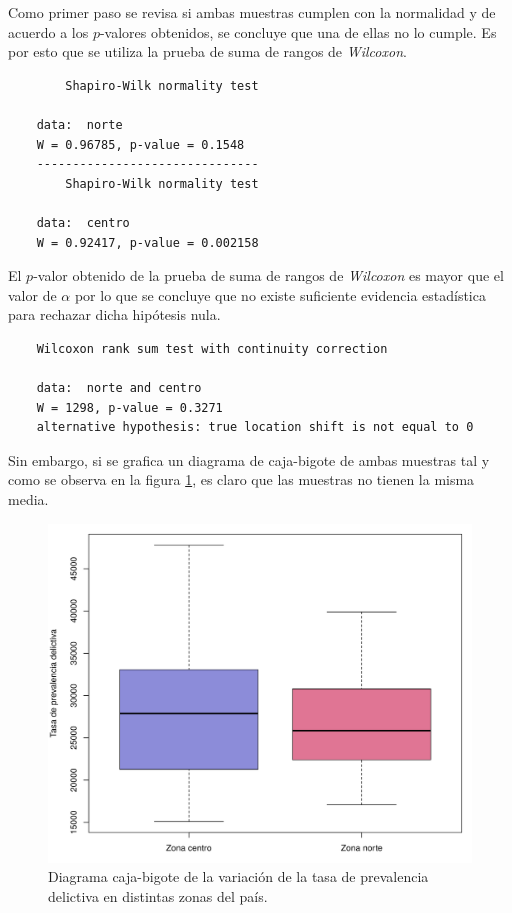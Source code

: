 \documentclass[12pt]{article}
\begin{document}
	Como primer paso se revisa si ambas muestras cumplen con la normalidad y de acuerdo a los $p$-valores obtenidos, se concluye que una de ellas no lo cumple. Es por esto que se utiliza la prueba de suma de rangos de {\em Wilcoxon}. 
	\begin{verbatim}
		Shapiro-Wilk normality test
	
	data:  norte
	W = 0.96785, p-value = 0.1548
	-------------------------------
		Shapiro-Wilk normality test
	
	data:  centro
	W = 0.92417, p-value = 0.002158
	\end{verbatim}
	
	El $p$-valor obtenido de la prueba de suma de rangos de {\em Wilcoxon} es mayor que el valor de $\alpha$ por lo que se concluye que no existe suficiente evidencia estadística para rechazar dicha hipótesis nula.
	\begin{verbatim}
	Wilcoxon rank sum test with continuity correction

	data:  norte and centro
	W = 1298, p-value = 0.3271
	alternative hypothesis: true location shift is not equal to 0
	\end{verbatim} 
	
	Sin embargo, si se grafica un diagrama de caja-bigote de ambas muestras tal y como se observa en la figura \ref{boxplot-zonas}, es claro que las muestras no tienen la misma media.
	
	\begin{figure}
		\centering
		\includegraphics[scale=0.5]{boxplot_norte-centro.png}
		\caption{Diagrama caja-bigote de la variación de la tasa de prevalencia delictiva en distintas zonas del país.}
		\label{boxplot-zonas}
	\end{figure}
\end{document}
